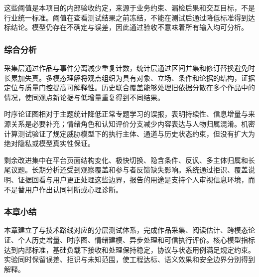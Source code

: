 这些阈值是本项目的内部验收约定，来源于业务约束、漏检后果和交互目标，不是行业统一标准。阈值在查看测试结果之前冻结，不能在测试后通过降低标准得到达标结论。模型仍存在不确定与误差，因此通过验收不意味着所有输入均可分析。

\subsubsection{综合分析}\label{section:3.10.2}

采集层通过作品与事件分离减少重复计数，统计层通过区间并集和修订替换避免时长累加失真。多模态理解将观点组织为具有对象、立场、条件和论据的结构，证据定位与质量门控提高可解释性。历史联合覆盖能够处理旧依据分散在多个作品中的情况，使同观点新论据与低增量重复得到不同结果。

时序论证图相对于主题统计降低正常专题学习的误报，表明持续性、信息增量与来源关系是必要补充；情绪角色和认知评价分支减少内容表达与人物归属混淆。机密计算测试验证了规定威胁模型下的执行主体、通道与历史状态约束，但没有扩大为绝对隐私或模型真实性保证。

剩余改进集中在平台页面结构变化、极快切换、隐含条件、反讽、多主体归属和长尾议题。长期分析还受到观察覆盖和参与者反馈缺失影响。系统通过拒识、覆盖说明、证据回看与用户更正处理这些边界，报告的用途是支持个人审视信息环境，而不是替用户作出认同判断或心理诊断。

\subsubsection{本章小结}\label{section:3.10.3}

本章建立了与技术路线对应的分层测试体系，完成作品采集、阅读估计、跨模态论证、个人历史增量、时序图、情绪建模、异步处理和可信执行评价。核心模型指标达到内部标准，基础负载下接收和处理保持稳定，协议与状态用例满足规定约束。实验同时保留误差、拒识与未知范围，使工程达标、语义效果和安全边界分别得到解释。
